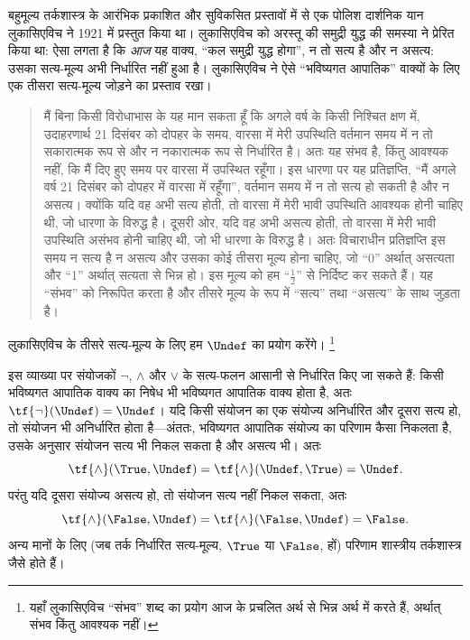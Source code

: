 \documentclass[../../../include/open-logic-section]{subfiles}
\begin{document}


बहुमूल्य तर्कशास्त्र के आरंभिक प्रकाशित और सुविकसित प्रस्तावों में से एक
पोलिश दार्शनिक यान लुकासिएविच ने 1921 में प्रस्तुत किया था। लुकासिएविच को
अरस्तू की समुद्री युद्ध की समस्या ने प्रेरित किया था: ऐसा लगता है कि
\emph{आज} यह वाक्य, ``कल समुद्री युद्ध होगा'', न तो सत्य है और न असत्य:
उसका सत्य-मूल्य अभी निर्धारित नहीं हुआ है। लुकासिएविच ने ऐसे
``भविष्यगत आपातिक'' वाक्यों के लिए एक तीसरा सत्य-मूल्य जोड़ने का प्रस्ताव
रखा।
\begin{quote}
मैं बिना किसी विरोधाभास के यह मान सकता हूँ कि अगले वर्ष के किसी निश्चित
क्षण में, उदाहरणार्थ 21 दिसंबर को दोपहर के समय, वारसा में मेरी उपस्थिति
वर्तमान समय में न तो सकारात्मक रूप से और न नकारात्मक रूप से निर्धारित है।
अतः यह संभव है, किंतु आवश्यक नहीं, कि मैं दिए हुए समय पर वारसा में उपस्थित
रहूँगा। इस धारणा पर यह प्रतिज्ञप्ति, ``मैं अगले वर्ष 21 दिसंबर को दोपहर में
वारसा में रहूँगा'', वर्तमान समय में न तो सत्य हो सकती है और न असत्य। क्योंकि
यदि वह अभी सत्य होती, तो वारसा में मेरी भावी उपस्थिति आवश्यक होनी चाहिए थी,
जो धारणा के विरुद्ध है। दूसरी ओर, यदि वह अभी असत्य होती, तो वारसा में मेरी
भावी उपस्थिति असंभव होनी चाहिए थी, जो भी धारणा के विरुद्ध है। अतः विचाराधीन
प्रतिज्ञप्ति इस समय न सत्य है न असत्य और उसका कोई तीसरा मूल्य होना चाहिए, जो
``0'' अर्थात् असत्यता और ``1'' अर्थात् सत्यता से भिन्न हो। इस मूल्य को हम
``$\frac{1}{2}$'' से निर्दिष्ट कर सकते हैं। यह ``संभव'' को निरूपित करता है
और तीसरे मूल्य के रूप में ``सत्य'' तथा ``असत्य'' के साथ जुड़ता है।
\end{quote}
लुकासिएविच के तीसरे सत्य-मूल्य के लिए हम $\Undef$ का प्रयोग करेंगे।
\footnote{यहाँ लुकासिएविच ``संभव'' शब्द का प्रयोग आज के प्रचलित अर्थ से
भिन्न अर्थ में करते हैं, अर्थात् संभव किंतु आवश्यक नहीं।}

इस व्याख्या पर संयोजकों $\lnot$, $\land$ और $\lor$ के सत्य-फलन आसानी से
निर्धारित किए जा सकते हैं: किसी भविष्यगत आपातिक वाक्य का निषेध भी भविष्यगत
आपातिक वाक्य होता है, अतः $\tf{\lnot}(\Undef) = \Undef$। यदि किसी संयोजन
का एक संयोज्य अनिर्धारित और दूसरा सत्य हो, तो संयोजन भी अनिर्धारित होता
है---अंततः, भविष्यगत आपातिक संयोज्य का परिणाम कैसा निकलता है, उसके अनुसार
संयोजन सत्य भी निकल सकता है और असत्य भी। अतः
\[
    \tf{\land}(\True, \Undef) =
\tf{\land}(\Undef, \True) =
\Undef.
\]
परंतु यदि दूसरा संयोज्य असत्य हो, तो संयोजन सत्य नहीं निकल सकता, अतः
\[\tf{\land}(\False, \Undef) =
\tf{\land}(\False, \Undef) = \False.\]
अन्य मानों के लिए (जब तर्क निर्धारित सत्य-मूल्य, $\True$ या $\False$, हों)
परिणाम शास्त्रीय तर्कशास्त्र जैसे होते हैं।
\end{document}
